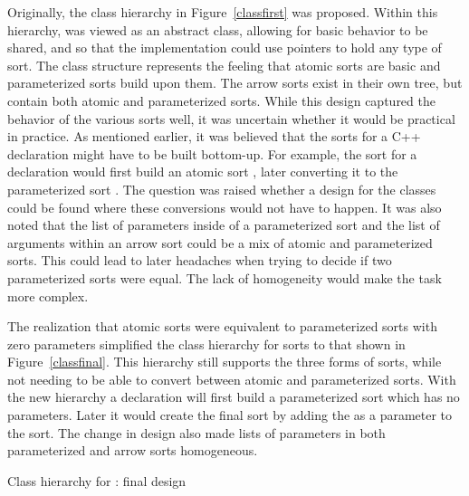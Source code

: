 Originally, the class hierarchy in Figure~\ref{classfirst} was
proposed. Within this hierarchy,  was viewed as an abstract
class, allowing for basic behavior to be shared, and so that the
implementation could use  pointers to hold any type of
sort. The class structure represents the feeling that atomic sorts are
basic and parameterized sorts build upon them. The arrow sorts exist
in their own tree, but contain both atomic and parameterized
sorts. While this design captured the behavior of the various sorts
well, it was uncertain whether it would be practical in practice. As
mentioned earlier, it was believed that the sorts for a C++
declaration might have to be built bottom-up. For example, the sort
for a declaration  would first build an atomic sort
, later converting it to the parameterized sort
. The question was raised whether a design for the
classes could be found where these conversions would not have to
happen. It was also noted that the list of parameters inside of a
parameterized sort and the list of arguments within an arrow sort could be a
mix of atomic and parameterized sorts. This could lead to 
later headaches when trying to decide if two parameterized sorts were
equal. The lack of homogeneity would make the task more complex.

The realization that atomic sorts were equivalent to parameterized
sorts with zero parameters simplified the class hierarchy for sorts to
that shown in Figure~\ref{classfinal}. This hierarchy still supports
the three forms of sorts, while not needing to be able to convert
between atomic and parameterized sorts. With the new hierarchy a
declaration  will first build a parameterized sort
 which has no parameters. Later it would create the
final sort  by adding the  as a
parameter to the  sort. The change in design also made
lists of parameters in both parameterized and arrow sorts homogeneous.

\begin{BFIGURE}
\begin{center}

\end{center}
\caption{Class hierarchy for : final design}
\label{classfinal}
\end{BFIGURE}

